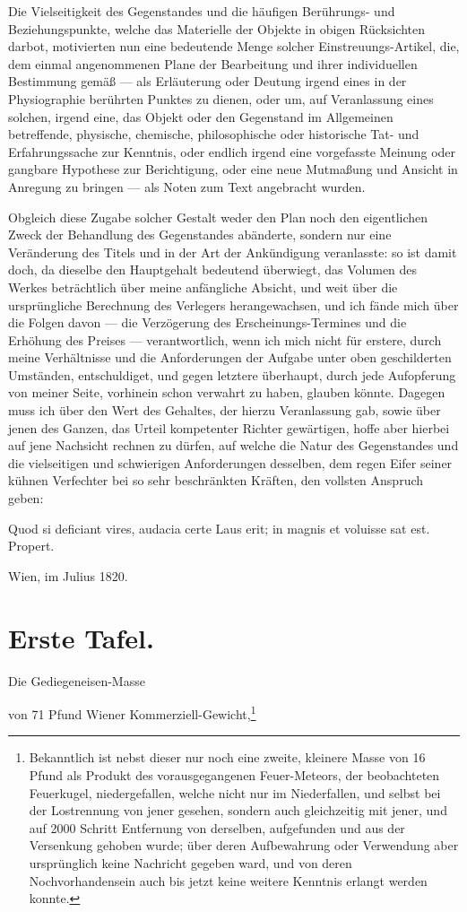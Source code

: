 \documentclass[a4paper, 11pt, oneside, german]{article}
\begin{document}
Die Vielseitigkeit des Gegenstandes und die häufigen Berührungs- und Beziehungspunkte, welche das Materielle der Objekte in obigen Rücksichten darbot, motivierten nun eine bedeutende Menge solcher Einstreuungs-Artikel, die, dem einmal angenommenen Plane der Bearbeitung und ihrer individuellen Bestimmung gemäß --- als Erläuterung oder Deutung irgend eines in der Physiographie berührten Punktes zu dienen, oder um, auf Veranlassung eines solchen, irgend eine, das Objekt oder den Gegenstand im Allgemeinen betreffende, physische, chemische, philosophische oder historische Tat- und Erfahrungssache zur Kenntnis, oder endlich irgend eine vorgefasste Meinung oder gangbare Hypothese zur Berichtigung, oder eine neue Mutmaßung und Ansicht in Anregung zu bringen --- als Noten zum Text angebracht wurden.

Obgleich diese Zugabe solcher Gestalt weder den Plan noch den eigentlichen Zweck der Behandlung des Gegenstandes abänderte, sondern nur eine Veränderung des Titels und in der Art der Ankündigung veranlasste: so ist damit doch, da dieselbe den Hauptgehalt bedeutend überwiegt, das Volumen des Werkes beträchtlich über meine anfängliche Absicht, und weit über die ursprüngliche Berechnung des Verlegers herangewachsen, und ich fände mich über die Folgen davon --- die Verzögerung des Erscheinungs-Termines und die Erhöhung des Preises --- verantwortlich, wenn ich mich nicht für erstere, durch meine Verhältnisse und die Anforderungen der Aufgabe unter oben geschilderten Umständen, entschuldiget, und gegen letztere überhaupt, durch jede Aufopferung von meiner Seite, vorhinein schon verwahrt zu haben, glauben könnte. Dagegen muss ich über den Wert des Gehaltes, der hierzu Veranlassung gab, sowie über jenen des Ganzen, das Urteil kompetenter Richter gewärtigen, hoffe aber hierbei auf jene Nachsicht rechnen zu dürfen, auf welche die Natur des Gegenstandes und die vielseitigen und schwierigen Anforderungen desselben, dem regen Eifer seiner kühnen Verfechter bei so sehr beschränkten Kräften, den vollsten Anspruch geben:

Quod si deficiant vires, audacia certe  
Laus erit; in magnis et voluisse sat est.  
Propert.

Wien, im Julius 1820.
\clearpage
\section{Erste Tafel.}
\begin{center}
Die Gediegeneisen-Masse

von 71 Pfund Wiener Kommerziell-Gewicht,\footnote{Bekanntlich ist nebst dieser nur noch eine zweite, kleinere Masse von 16 Pfund als Produkt des vorausgegangenen Feuer-Meteors, der beobachteten Feuerkugel, niedergefallen, welche nicht nur im Niederfallen, und selbst bei der Lostrennung von jener gesehen, sondern auch gleichzeitig mit jener, und auf 2000 Schritt Entfernung von derselben, aufgefunden und aus der Versenkung gehoben wurde; über deren Aufbewahrung oder Verwendung aber ursprünglich keine Nachricht gegeben ward, und von deren Nochvorhandensein auch bis jetzt keine weitere Kenntnis erlangt werden konnte.}
\end{center}
\end{document}

